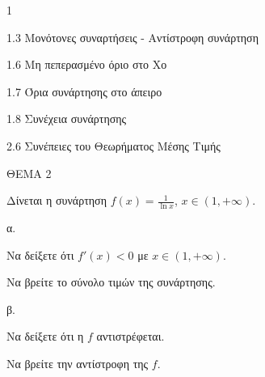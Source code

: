 \begin{ylh}{1}
    \item 1.3 Μονότονες συναρτήσεις - Αντίστροφη συνάρτηση
    \item 1.6 Μη πεπερασμένο όριο στο Χο
    \item 1.7 Όρια συνάρτησης στο άπειρο
    \item 1.8 Συνέχεια συνάρτησης
    \item 2.6 Συνέπειες του Θεωρήματος Μέσης Τιμής
\end{ylh}
ΘΕΜΑ 2

Δίνεται η συνάρτηση $f(x) = \frac{1}{\ln x}$, $x \in (1,+\infty)$.

\begin{alist}
\item α.
    \begin{rlist}
    \item Να δείξετε ότι $f'(x)<0$ με $x \in (1, +\infty)$. 
    \item Να βρείτε το σύνολο τιμών της συνάρτησης. 
    \end{rlist}
\item β.
    \begin{rlist}
    \item Να δείξετε ότι η $f$ αντιστρέφεται. 
    \item Να βρείτε την αντίστροφη της $f$. 
    \end{rlist}
\end{alist}